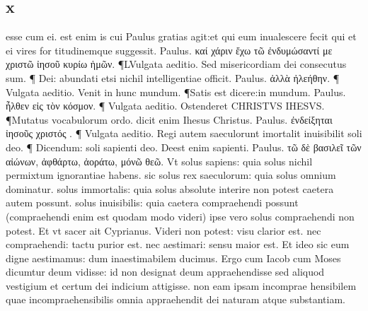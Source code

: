 \documentclass{article}
\begin{document}
\begin{pages}
\section*{x }
\marginpar{[ p.203 ]}\pstart esse cum ei. est enim is cui Paulus gratias agit:et qui eum inualescere fecit qui et ei vires for titudinemque suggessit. Paulus. καί χάριν ἔχω τῶ ἐνδυμώσαντί με χριστῶ ἰησοῦ  κυρίω ἡμῶν. ¶LVulgata aeditio. Sed misericordiam dei consecutus sum. ¶ Dei: abundati  etsi nichil intelligentiae officit. Paulus. ἀλλὰ ἠλεήθην. ¶ Vulgata aeditio. Venit in  hunc mundum. ¶Satis est dicere:in mundum. Paulus. ἦλθεν εἰς τὸν κόσμον. ¶ Vulgata aeditio. Ostenderet CHRISTVS IHESVS. ¶Mutatus vocabulorum ordo. dicit enim  Ihesus Christus. Paulus. ἐνδείξηται ἰησοῦς χριστός . ¶ Vulgata aeditio. Regi autem  saeculorunt imortalit inuisibilit soli deo. ¶ Dicendum: soli sapienti deo. Deest enim sapienti. Paulus. τῶ δὲ βασιλεῖ τῶν αἰώνων, ἀφθάρτω, ἀοράτω, μόνῶ θεῶ. Vt solus sapiens: quia solus nichil permixtum ignorantiae habens. sic solus rex saeculorum: quia solus omnium dominatur. solus immortalis: quia solus absolute interire non potest caetera autem possunt. solus inuisibilis: quia caetera compraehendi possunt (compraehendi enim est quodam modo videri) ipse vero solus compraehendi non potest. Et vt sacer ait Cyprianus. Videri non potest: visu clarior est. nec compraehendi: tactu purior est. nec aestimari: sensu maior est. Et ideo sic eum digne aestimamus: dum inaestimabilem ducimus. Ergo cum Iacob cum Moses dicumtur deum vidisse: id non designat deum appraehendisse sed aliquod vestigium et certum dei indicium attigisse. non eam ipsam incomprae hensibilem quae incompraehensibilis omnia appraehendit dei naturam atque substantiam.  \pend

\end{pages}
\end{document}
